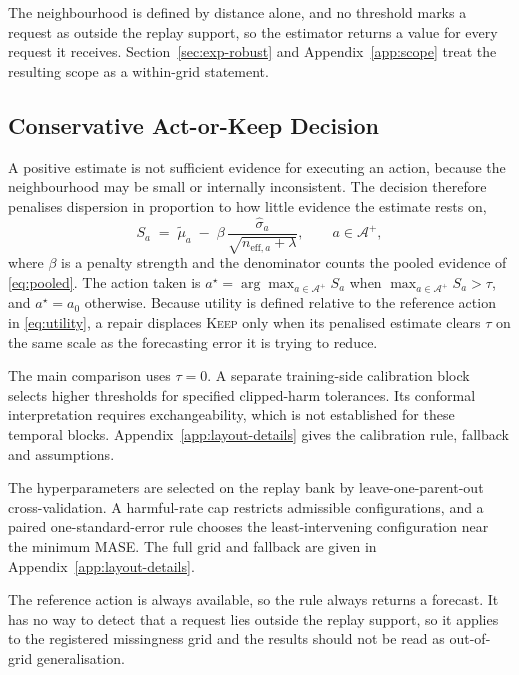 \documentclass{article}
\newcommand{\calA}{\mathcal{A}}
\begin{document}
The neighbourhood is defined by distance alone, and no threshold marks a request as outside the
replay support, so the estimator returns a value for every request it receives.
Section~\ref{sec:exp-robust} and Appendix~\ref{app:scope} treat the resulting scope as a
within-grid statement.

\subsection{Conservative Act-or-Keep Decision}
\label{sec:method-decision}
A positive estimate is not sufficient evidence for executing an action, because the
neighbourhood may be small or internally inconsistent. The decision therefore penalises
dispersion in proportion to how little evidence the estimate rests on,
\begin{equation}
  S_a \;=\; \tilde\mu_a \;-\; \beta\, \frac{\hat\sigma_a}{\sqrt{n_{\mathrm{eff},a} + \lambda}},
  \qquad a \in \calA^{+},
  \label{eq:score}
\end{equation}
where $\beta$ is a penalty strength and the denominator counts the pooled evidence of
\eqref{eq:pooled}. The action taken is $a^{\star} = \arg\max_{a \in \calA^{+}} S_a$ when
$\max_{a \in \calA^{+}} S_a > \tau$, and $a^{\star} = a_0$ otherwise. Because utility is
defined relative to the reference action in \eqref{eq:utility}, a repair displaces
\textsc{Keep} only when its penalised estimate clears $\tau$ on the same scale as the
forecasting error it is trying to reduce.

The main comparison uses $\tau=0$. A separate training-side calibration block selects
higher thresholds for specified clipped-harm tolerances. Its conformal interpretation
requires exchangeability, which is not established for these temporal blocks.
Appendix~\ref{app:layout-details} gives the calibration rule, fallback and assumptions.

The hyperparameters are selected on the replay bank by leave-one-parent-out cross-validation.
A harmful-rate cap restricts admissible configurations, and a paired one-standard-error rule
chooses the least-intervening configuration near the minimum MASE. The full grid and fallback
are given in Appendix~\ref{app:layout-details}.

The reference action is always available, so the rule always returns a forecast. It has no way
to detect that a request lies outside the replay support, so it applies to the registered
missingness grid and the results should not be read as out-of-grid generalisation.
\end{document}
